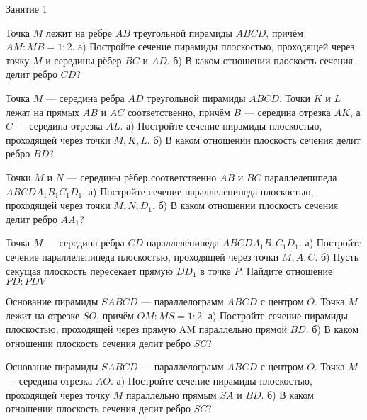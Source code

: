 %
%

\begin{class}[number=1]
	\begin{listofex}
		\item Занятие 1
	\end{listofex}
\end{class}

\begin{class}[number=2]
	\begin{listofex}
		\item Точка \(M\) лежит на ребре \(AB\) треугольной пирамиды \(ABCD\), причём \(AM : MB = 1:2\). а) Постройте сечение пирамиды плоскостью, проходящей через точку \(M\) и середины рёбер \(BC\) и \(AD\). б) В каком отношении плоскость сечения делит ребро \(CD\)?
		\item Точка \(M\) — середина ребра \(AD\) треугольной пирамиды \(ABCD\). Точки \(K\) и \(L\) лежат на прямых \(AB\) и \(AC\) соответственно, причём \(B\) --- середина отрезка \(AK\), а \(C\) — середина отрезка \(AL\). а) Постройте сечение пирамиды плоскостью, проходящей через точки \(M, K, L\). б) В каком отношении плоскость сечения делит ребро \(BD\)?
		\item Точки \(M\) и \(N\) — середины рёбер соответственно \(AB\) и \(BC\) параллелепипеда \(ABCDA_1B_1C_1D_1\).
		а) Постройте сечение параллелепипеда плоскостью, проходящей через точки \(M, N, D_1\). б) В каком отношении плоскость сечения делит ребро \(AA_1\)?
		\item Точка \(M\) — середина ребра \(CD\) параллелепипеда \(ABCDA_1B_1C_1D_1\). а) Постройте сечение параллелепипеда плоскостью, проходящей через точки \(M, A, C\). б) Пусть секущая плоскость пересекает прямую \(DD_1\) в точке \(P\). Найдите отношение \(PD:PDV\)
		\item Основание пирамиды \(SABCD\) — параллелограмм \(ABCD\) с центром \(O\). Точка \(M\) лежит на отрезке \(SO\), причём \(OM:MS = 1:2\). а) Постройте сечение пирамиды плоскостью, проходящей через прямую AM параллельно прямой \(BD\). б) В каком отношении плоскость сечения делит ребро \(SC\)?
		\item Основание пирамиды \(SABCD\) — параллелограмм \(ABCD\) с центром \(O\). Точка \(M\) — середина отрезка \(AO\). а) Постройте сечение пирамиды плоскостью, проходящей через точку \(M\) параллельно прямым \(SA\) и \(BD\). б) В каком отношении плоскость сечения делит ребро \(SC\)?
	\end{listofex}
\end{class}

